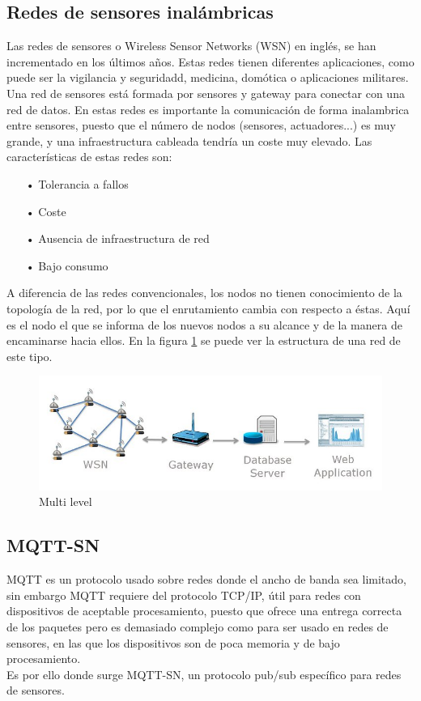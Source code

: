 \documentclass[12pt, twoside]{book}
\begin{document}
\subsection{Redes de sensores inalámbricas}
Las redes de sensores o Wireless Sensor Networks (WSN) en inglés, se han incrementado en los últimos años. Estas redes tienen diferentes aplicaciones, como puede ser la vigilancia y seguridadd, medicina, domótica o aplicaciones militares. Una red de sensores está formada por sensores y gateway para conectar con una red de datos. En estas redes es importante la comunicación de forma inalambrica entre sensores, puesto que el número de nodos (sensores, actuadores...) es muy grande, y una infraestructura cableada tendría un coste muy elevado. Las características de estas redes son:
\begin{itemize}
\item[•]Tolerancia a fallos\\
\item[•]Coste\\
\item[•]Ausencia de infraestructura de red\\
\item[•]Bajo consumo
\end{itemize} 
A diferencia de las redes convencionales, los nodos no tienen conocimiento de la topología de la red, por lo que el enrutamiento cambia con respecto a éstas. Aquí es el nodo el que se informa de los nuevos nodos a su alcance y de la manera de encaminarse hacia ellos. En la figura \ref{L411} se puede ver la estructura de una red de este tipo.
\begin{figure}[H]
\centering
\includegraphics[scale=0.5]{images/wsn}
\caption{Multi level}\label{L411}
\end{figure}
 
\subsection{MQTT-SN}
MQTT es un protocolo usado sobre redes donde el ancho de banda sea limitado, sin embargo MQTT requiere del protocolo TCP/IP, útil para redes con dispositivos de aceptable procesamiento, puesto que ofrece una entrega correcta de los paquetes pero es demasiado complejo como para ser usado en redes de sensores, en las que los dispositivos son de poca memoria y de bajo procesamiento.\\
Es por ello donde surge MQTT-SN, un protocolo pub/sub específico para redes de sensores. 
\end{document}
